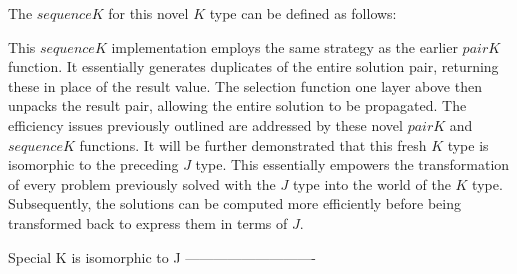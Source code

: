 The $sequenceK$ for this novel $K$ type can be defined as follows:
\resethooks
This $sequenceK$ implementation employs the same strategy as the earlier $pairK$ function. 
It essentially generates duplicates of the entire solution pair, returning these in place 
of the result value. The selection function one layer above then unpacks the result pair, 
allowing the entire solution to be propagated.
The efficiency issues previously outlined are addressed by these novel $pairK$ and 
$sequenceK$ functions. It will be further demonstrated that this fresh $K$ type is 
isomorphic to the preceding $J$ type. This essentially empowers the transformation of 
every problem previously solved with the $J$ type into the world of the $K$ type. 
Subsequently, the solutions can be computed more efficiently before being transformed back 
to express them in terms of $J$.

Special K is isomorphic to J
----------------------------

